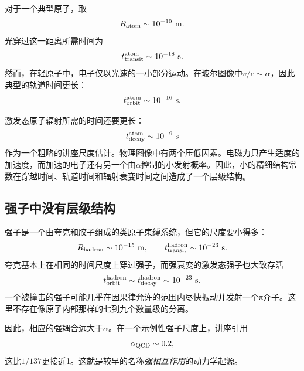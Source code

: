 对于一个典型原子，取
\begin{equation}
R_{\rm atom}\sim10^{-10}\ {\rm m}.
\end{equation}
光穿过这一距离所需时间为
\begin{equation}
t_{\rm transit}^{\rm atom}\sim10^{-18}\ {\rm s}.
\end{equation}
然而，在轻原子中，电子仅以光速的一小部分运动。在玻尔图像中\(v/c\sim\alpha\)，因此典型的轨道时间更长：
\begin{equation}
t_{\rm orbit}^{\rm atom}\sim10^{-16}\ {\rm s}.
\end{equation}

激发态原子辐射所需的时间还要更长：
\begin{equation}
t_{\rm decay}^{\rm atom}\sim10^{-9}\ {\rm s}
\end{equation}
作为一个粗略的讲座尺度估计。物理图像中有两个压低因素。电磁力只产生适度的加速度，而加速的电子还有另一个由\(\alpha\)控制的小发射概率。因此，小的精细结构常数在穿越时间、轨道时间和辐射衰变时间之间造成了一个层级结构。

\subsection{强子中没有层级结构}

强子是一个由夸克和胶子组成的类原子束缚系统，但它的尺度要小得多：
\begin{equation}
R_{\rm hadron}\sim10^{-15}\ {\rm m},
\qquad
t_{\rm transit}^{\rm hadron}\sim10^{-23}\ {\rm s}.
\end{equation}
夸克基本上在相同的时间尺度上穿过强子，而强衰变的激发态强子也大致存活
\begin{equation}
t_{\rm orbit}^{\rm hadron}
\sim t_{\rm decay}^{\rm hadron}
\sim10^{-23}\ {\rm s}.
\end{equation}
一个被撞击的强子可能几乎在因果律允许的范围内尽快振动并发射一个{\proseunicodefont π}介子。这里不存在像原子内部那样的七到九个数量级的分离。

\begin{classroomqa}
\end{classroomqa}

因此，相应的强耦合远大于\(\alpha\)。在一个示例性强子尺度上，讲座引用
\begin{equation}
\alpha_{\rm QCD}\sim0.2,
\end{equation}
这比\(1/137\)更接近1。这就是较早的名称\emph{强相互作用}的动力学起源。

